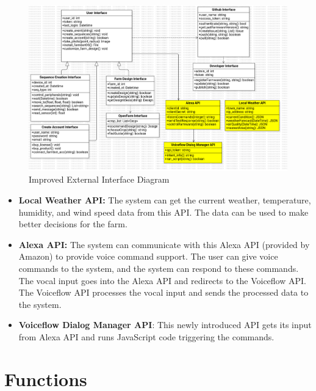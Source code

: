 \begin{figure}[H]
    \centering
    \includegraphics[width=1\textwidth]{UML Diagrams/SuggestedClassDiagram.png}
    \caption{Improved External Interface Diagram}
    \label{fig:suggested_external}
\end{figure}

\begin{itemize}
    \item \textbf{Local Weather API:} The system can get the current weather, temperature, humidity, and wind speed data from this API. The data can be used to make better decisions for the farm.
    \item \textbf{Alexa API:} The system can communicate with this Alexa API (provided by Amazon) to provide voice command support. The user can give voice commands to the system, and the system can respond to these commands. The vocal input goes into the Alexa API and redirects to the Voiceflow API. The Voiceflow API processes the vocal input and sends the processed data to the system.
    \item \textbf{Voiceflow Dialog Manager API}: This newly introduced API gets its input from Alexa API and runs JavaScript code triggering the commands.
\end{itemize}



\section{Functions}

